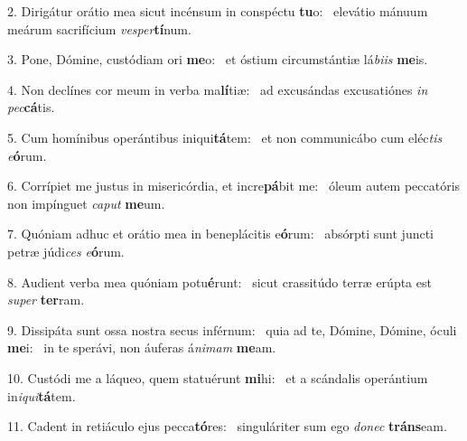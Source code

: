 2. Dirigátur orátio mea sicut incénsum in conspéctu \textbf{tu}o: \ast\  elevátio mánuum meárum sacrifícium \textit{ves}\textit{per}\textbf{tí}num.\

3. Pone, Dómine, custódiam ori \textbf{me}o: \ast\  et óstium circumstántiæ lá\textit{bi}\textit{is} \textbf{me}is.\

4. Non declínes cor meum in verba ma\textbf{lí}tiæ: \ast\  ad excusándas excusatiónes \textit{in} \textit{pec}\textbf{cá}tis.\

5. Cum homínibus operántibus iniqui\textbf{tá}tem: \ast\  et non communicábo cum eléc\textit{tis} \textit{e}\textbf{ó}rum.\

6. Corrípiet me justus in misericórdia, et incre\textbf{pá}bit me: \ast\  óleum autem peccatóris non impínguet \textit{ca}\textit{put} \textbf{me}um.\

7. Quóniam adhuc et orátio mea in beneplácitis e\textbf{ó}rum: \ast\  absórpti sunt juncti petræ júdi\textit{ces} \textit{e}\textbf{ó}rum.\

8. Audient verba mea quóniam potu\textbf{é}runt: \ast\  sicut crassitúdo terræ erúpta est \textit{su}\textit{per} \textbf{ter}ram.\

9. Dissipáta sunt ossa nostra secus inférnum: \dag\  quia ad te, Dómine, Dómine, óculi \textbf{me}i: \ast\  in te sperávi, non áuferas á\textit{ni}\textit{mam} \textbf{me}am.\

10. Custódi me a láqueo, quem statuérunt \textbf{mi}hi: \ast\  et a scándalis operántium in\textit{i}\textit{qui}\textbf{tá}tem.\

11. Cadent in retiáculo ejus pecca\textbf{tó}res: \ast\  singuláriter sum ego \textit{do}\textit{nec} \textbf{tráns}eam.\

